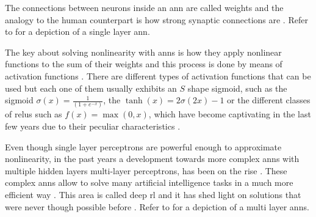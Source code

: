 The connections between neurons inside an \gls{ann} are called weights and the analogy to the human counterpart is how strong synaptic connections are \citep[p. 216]{Sutton2017}. Refer to  for a depiction of a single layer \gls{ann}.

The key about solving nonlinearity with \glspl{ann} is how they apply nonlinear functions to the sum of their weights and this process is done by means of activation functions \citep[p. 216]{Sutton2017}. There are different types of activation functions that can be used but each one of them usually exhibits an $S$ shape \ie sigmoid, such as the sigmoid $\sigma(x) = \frac{1}{(1+e^{-x})}$, the $\tanh(x) = 2\sigma(2x)-1$ or the different classes of \glspl{relu} such as $f(x) = \max(0,x)$, which have become captivating in the last few years due to their peculiar characteristics \citep[p. 216]{Sutton2017}.

Even though single layer perceptrons are powerful enough to approximate nonlinearity, in the past years a development towards more complex \glspl{ann} with multiple hidden layers \ie multi-layer perceptrons, has been on the rise \citep[p. 217]{Sutton2017}. These complex \glspl{ann} allow to solve many artificial intelligence tasks in a much more efficient way \citep{Bengio2009}. This area is called deep \gls{rl} and it has shed light on solutions that were never though possible before \citep{Bengio2009}. Refer to  for a depiction of a multi layer \glspl{ann}.

